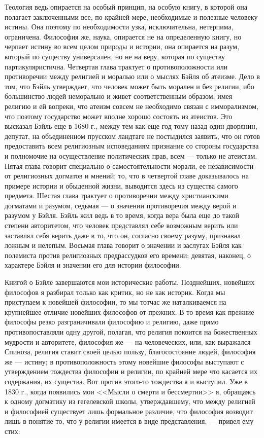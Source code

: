 \documentclass[12pt]{article}
\begin{document}
Теология ведь опирается на особый принцип, на особую книгу, в которой она полагает заключенными все, по крайней мере, необходимые и полезные человеку истины. Она поэтому по необходимости узка, исключительна, нетерпима, ограничена. Философия же, наука, опирается не на определенную книгу, но черпает истину во всем целом природы и истории, она опирается на разум, который по существу универсален, но не на веру, которая по существу партикуляристична. Четвертая глава трактует о противоположности или противоречии между религией и моралью или о мыслях Бэйля об атеизме. Дело в том, что Бэйль утверждает, что человек может быть морален и без религии, ибо большинство людей неморально и живет соответственным образом, имея религию и ей вопреки, что атеизм совсем не необходимо связан с имморализмом, что поэтому государство может вполне хорошо состоять из атеистов. Это высказал Бэйль еще в 1680 г., между тем как еще год тому назад один дворянин, депутат, на объединенном прусском ландтаге не постыдился заявить, что он готов предоставить всем религиозным исповеданиям признание со стороны государства и полномочие на осуществление политических прав, всем --- только не атеистам. Пятая глава говорит специально о самостоятельности морали, ее независимости от религиозных догматов и мнений; то, что в четвертой главе доказывалось на примере истории и обыденной жизни, выводится здесь из существа самого предмета. Шестая глава трактует о противоречии между христианскими догматами и разумом, седьмая --- о значении противоречия между верой и разумом у Бэйля. Бэйль жил ведь в то время, когда вера была еще до такой степени авторитетом, что человек представлял себе возможным верить или заставлял себя верить даже в то, что он, согласно своему разуму, признавал ложным и нелепым. Восьмая глава говорит о значении и заслугах Бэйля как полемиста против религиозных предрассудков его времени; девятая, наконец, о характере Бэйля и значении его для истории философии. 

Книгой о Бэйле завершаются мои исторические работы. Позднейших, новейших философов я разбирал только как критик, но не как историк. Когда мы приступаем к новейшей философии, то мы тотчас же наталкиваемся на крупнейшее отличие новейших философов от прежних. В то время как прежние философы резко разграничивали философию и религию, даже прямо противопоставляли одну другой, полагая, что религия покоится на божественных мудрости и авторитете, философия же --- на человеческих, или, как выражался Спиноза, религия ставит своей целью пользу, благосостояние людей, философия же --- истину; в противоположность этому новейшие философы выступают с утверждением тождества философии и религии, по крайней мере что касается их содержания, их существа. Вот против этого-то тождества я и выступил. Уже в 1830 г., когда появились мои <<Мысли о смерти и бессмертии>>  я, обращаясь к одному догматику из гегелевской школы, утверждавшему, что между религией и философией существует лишь формальное различие, что философия возводит лишь в понятие то, что у религии имеется в виде представления, --- привел ему стих:
\end{document}
